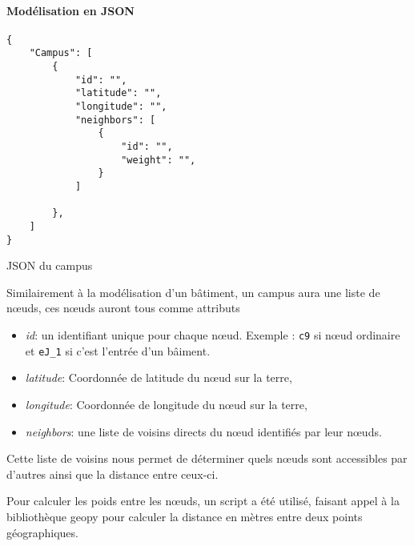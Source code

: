 \documentclass[journal, a4paper]{IEEEtran}
\begin{document}
\vspace{0.25cm}

\paragraph{Modélisation en \textbf{JSON}}
\begin{listing}
    \begin{verbatim}
{
    "Campus": [
    	{
    		"id": "",
    		"latitude": "",
            "longitude": "",
    		"neighbors": [
    			{
    				"id": "",
    				"weight": "",
    			}
    		]

    	},
    ]
}
    \end{verbatim}
    \caption{JSON du campus} 
    \label{lst:json-campus}
\end{listing}
Similairement à la modélisation d'un bâtiment, un campus aura une liste de nœuds, 
ces nœuds auront tous comme attributs 

\begin{itemize}
	\item \textit{id}: un identifiant unique pour chaque nœud. Exemple : \texttt{c9} si nœud ordinaire et \texttt{eJ\_1} si c'est l'entrée d'un bâiment.
        \item \textit{latitude}: Coordonnée de latitude du nœud sur la terre,
        \item \textit{longitude}: Coordonnée de longitude du nœud sur la terre,
	\item \textit{neighbors}: une liste de voisins directs du nœud identifiés par leur nœuds.
\end{itemize}

Cette liste de voisins nous permet de déterminer quels nœuds sont accessibles par d'autres ainsi que la distance entre ceux-ci.

Pour calculer les poids entre les nœuds, un script a été utilisé, faisant appel à la bibliothèque geopy \cite{geopy}
pour calculer la distance en mètres entre 
deux points géographiques.
\end{document}
